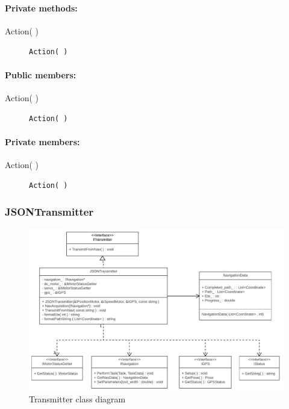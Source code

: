 \paragraph{Private methods:}
\begin{adjustwidth}{2.5em}{0pt}\begin{description}
		\item [Action( )] \texttt{Action( )}
\end{description}\end{adjustwidth}

\paragraph{Public members:}
\begin{adjustwidth}{2.5em}{0pt}\begin{description}
		\item [Action( )] \texttt{Action( )} 
\end{description}\end{adjustwidth}

\paragraph{Private members:}
\begin{adjustwidth}{2.5em}{0pt}\begin{description}
		\item [Action( )] \texttt{Action( )}
\end{description}\end{adjustwidth}

\subsubsection{JSONTransmitter}

\begin{figure}[H]
\centering
\includegraphics[width=1\linewidth]{Images/Design/Transmitter_class_diagram}
\caption{Transmitter class diagram}
\label{fig:Transmitter}
\end{figure}


